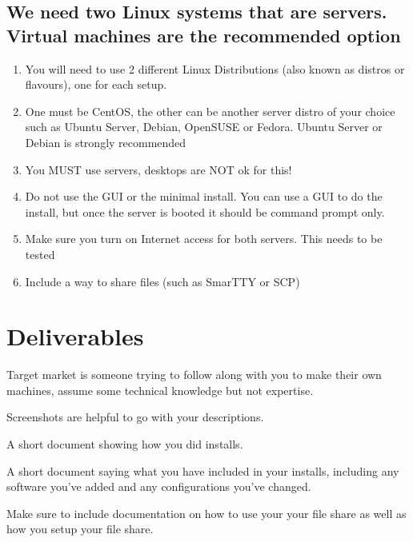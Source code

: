 \documentclass[12pt]{article}
\begin{document}
\subsection*{We need two Linux systems that are servers.  Virtual machines are the recommended option}
    \begin{enumerate}
        \item You will need to use 2 different Linux Distributions (also known as distros or flavours), one for each setup.
        \item One must be CentOS, the other can be another server distro of your choice such as Ubuntu Server, Debian, OpenSUSE or Fedora.  Ubuntu Server or Debian is strongly recommended
        \item You MUST use servers, desktops are NOT ok for this! 
        \item Do not use the GUI or the minimal install. You can use a GUI to do the install, but once the server is booted it should be command prompt only.
        \item Make sure you turn on Internet access for both servers.  This needs to be tested
        \item Include a way to share files (such as SmarTTY or SCP)


    \end{enumerate}



\section*{Deliverables}

Target market is someone trying to follow along with you to make their own machines, assume some technical knowledge but not expertise. 

Screenshots are helpful to go with your descriptions.

A short document showing how you did installs.  


A short document saying what you have included in your installs, including any software you've added and any configurations you've changed. 

Make sure to include documentation on how to use your your file share as well as how you setup your file share.
\end{document}
